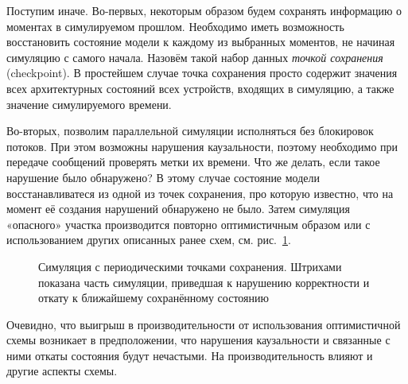 Поступим иначе. Во-первых, некоторым образом будем сохранять информацию о моментах в симулируемом прошлом. Необходимо иметь возможность восстановить состояние модели к каждому из выбранных моментов, не начиная симуляцию с самого начала. Назовём такой набор данных \textit{точкой сохранения} (\abbr checkpoint). В простейшем случае точка сохранения просто содержит значения всех архитектурных состояний всех устройств, входящих в симуляцию, а также значение симулируемого времени.

Во-вторых, позволим параллельной симуляции исполняться без блокировок потоков. При этом возможны нарушения каузальности, поэтому необходимо при передаче сообщений проверять метки их времени. Что же делать, если такое нарушение было обнаружено? В этому случае состояние модели восстанавливатеся из одной из точек сохранения, про которую известно, что на момент её создания нарушений обнаружено не было. Затем симуляция «опасного» участка производится повторно оптимистичным образом или с использованием других описанных ранее схем, см. рис.~\ref{fig:checkpoints}.

\begin{figure}[htbp]
    \centering
    \caption[Симуляция с периодическими точками сохранения]{Симуляция с периодическими точками сохранения. Штрихами показана часть симуляции, приведшая к нарушению корректности и откату к ближайшему сохранённому состоянию}
    \label{fig:checkpoints}
    
\end{figure}

Очевидно, что выигрыш в производительности от использования оптимистичной схемы возникает в предположении, что нарушения каузальности и связанные с ними откаты состояния будут нечастыми. На производительность влияют и другие аспекты схемы.


